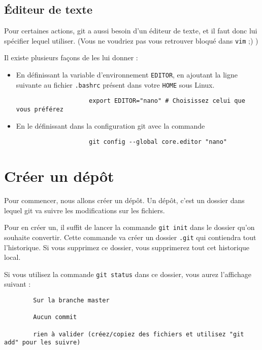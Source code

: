 \documentclass[10pt,a4paper,french]{article}
\begin{document}
    \subsection{Éditeur de texte}
        \label{subsec:parametrage:editeur}

        Pour certaines actions, git a aussi besoin d'un éditeur de texte, et il faut donc lui spécifier lequel utiliser. (Vous ne voudriez pas vous retrouver bloqué dans \verb|vim| ;) )

        Il existe plusieurs façons de les lui donner :
        \begin{itemize}
            \item
                En définissant la variable d'environnement \verb|EDITOR|, en ajoutant la ligne suivante au fichier \verb|.bashrc| présent dans votre \verb|HOME| sous Linux.
                \begin{verbatim}
                    export EDITOR="nano" # Choisissez celui que vous préférez
                \end{verbatim}
            \item
                En le définissant dans la configuration git avec la commande
                \begin{verbatim}
                    git config --global core.editor "nano"
                \end{verbatim}
        \end{itemize}

\section{Créer un dépôt}

    Pour commencer, nous allons créer un  dépôt. Un dépôt, c'est un dossier dans lequel git va suivre les modifications sur les fichiers.

    Pour en créer un, il suffit de lancer la commande \verb|git init| dans le dossier qu'on souhaite convertir. Cette commande va créer un dossier \verb|.git| qui contiendra tout l'historique. Si vous supprimez ce dossier, vous supprimerez tout cet historique local.

    Si vous utilisez la commande \verb|git status| dans ce dossier, vous aurez l'affichage suivant :
    \begin{verbatim}
        Sur la branche master

        Aucun commit

        rien à valider (créez/copiez des fichiers et utilisez "git add" pour les suivre)
    \end{verbatim}
\end{document}
